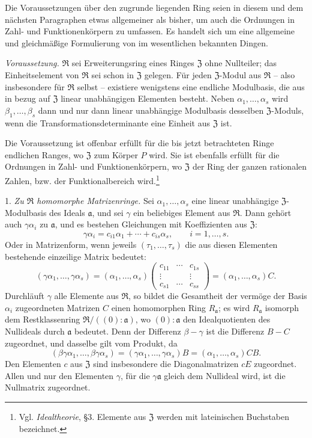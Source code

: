 \documentclass[11pt]{article}
\providecommand{\mR}{\mathfrak{R}}
\providecommand{\mZ}{\mathfrak{Z}}
\providecommand{\ma}{\mathfrak{a}}
\begin{document}
Die Voraussetzungen über den zugrunde liegenden Ring seien in diesem und dem nächsten Paragraphen etwas allgemeiner als bisher, um auch die Ordnungen in Zahl- und Funktionenkörpern zu umfassen. Es handelt sich um eine allgemeine und gleichmäßige Formulierung von im wesentlichen bekannten Dingen.

\emph{Voraussetzung.} $\mR$ sei Erweiterungsring eines Ringes $\mZ$ ohne Nullteiler; das Einheitselement von $\mR$ sei schon in $\mZ$ gelegen. Für jeden $\mZ$-Modul aus $\mR$ -- also insbesondere für $\mR$ selbst -- existiere wenigstens eine endliche Modulbasis, die aus in bezug auf $\mZ$ linear unabhängigen Elementen besteht. Neben $\alpha_1,\ldots,\alpha_s$ wird $\beta_1,\ldots,\beta_s$ dann und nur dann linear unabhängige Modulbasis desselben $\mZ$-Moduls, wenn die Transformationsdeterminante eine Einheit aus $\mZ$ ist.

Die Voraussetzung ist offenbar erfüllt für die bis jetzt betrachteten Ringe endlichen Ranges, wo $\mZ$ zum Körper $P$ wird. Sie ist ebenfalls erfüllt für die Ordnungen in Zahl- und Funktionenkörpern, wo $\mZ$ der Ring der ganzen rationalen Zahlen, bzw. der Funktionalbereich wird.\footnote{Vgl. \emph{Idealtheorie}, §3. Elemente aus $\mZ$ werden mit lateinischen Buchstaben bezeichnet.}

1. \emph{Zu $\mR$ homomorphe Matrizenringe.} Sei $\alpha_1,\ldots,\alpha_s$ eine linear unabhängige $\mZ$-Modulbasis des Ideals $\ma$, und sei $\gamma$ ein beliebiges Element aus $\mR$. Dann gehört auch $\gamma\alpha_i$ zu $\ma$, und es bestehen Gleichungen mit Koeffizienten aus $\mZ$:
\[
        \gamma\alpha_i=c_{i1}\alpha_1+\cdots+c_{is}\alpha_s,
        \qquad i=1,\ldots,s.
\]
Oder in Matrizenform, wenn jeweils $(\tau_1,\ldots,\tau_s)$ die aus diesen Elementen bestehende einzeilige Matrix bedeutet:
\[
 (\gamma\alpha_1,\ldots,\gamma\alpha_s)
 = (\alpha_1,\ldots,\alpha_s)
   \begin{pmatrix}
      c_{11}&\cdots&c_{1s}\\
      \vdots&&\vdots\\
      c_{s1}&\cdots&c_{ss}
   \end{pmatrix}
 = (\alpha_1,\ldots,\alpha_s)C.
\]
Durchläuft $\gamma$ alle Elemente aus $\mR$, so bildet die Gesamtheit der vermöge der Basis $\alpha_i$ zugeordneten Matrizen $C$ einen homomorphen Ring $R_\ma$; es wird $R_\ma$ isomorph dem Restklassenring $\mR/((0):\ma)$, wo $(0):\ma$ den Idealquotienten des Nullideals durch $\ma$ bedeutet. Denn der Differenz $\beta-\gamma$ ist die Differenz $B-C$ zugeordnet, und dasselbe gilt vom Produkt, da
\[
(\beta\gamma\alpha_1,\ldots,\beta\gamma\alpha_s)
=(\gamma\alpha_1,\ldots,\gamma\alpha_s)B
=(\alpha_1,\ldots,\alpha_s)CB.
\]
Den Elementen $c$ aus $\mZ$ sind insbesondere die Diagonalmatrizen $cE$ zugeordnet. Allen und nur den Elementen $\gamma$, für die $\gamma\ma$ gleich dem Nullideal wird, ist die Nullmatrix zugeordnet.
\end{document}
